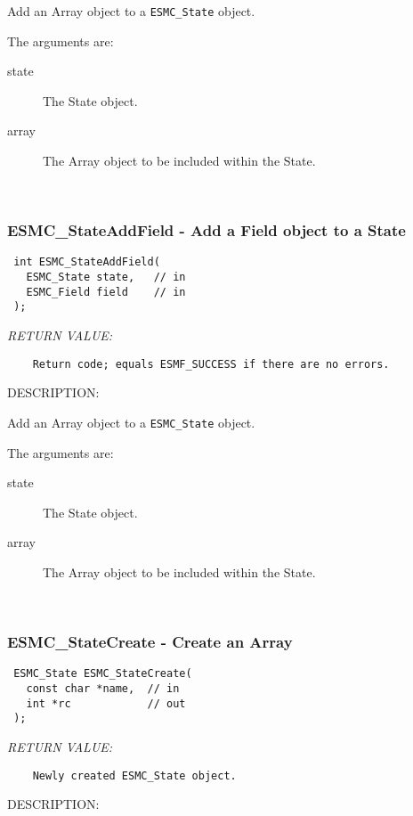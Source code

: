   
    Add an Array object to a {\tt ESMC\_State} object.
  
    The arguments are:
    \begin{description}
    \item[state]
      The State object.
    \item[array]
      The Array object to be included within the State.
    \end{description}
   
 
\mbox{}\hrulefill\ 
 
\subsubsection [ESMC\_StateAddField] {ESMC\_StateAddField - Add a Field object to a State}


  
\begin{verbatim} int ESMC_StateAddField(
   ESMC_State state,   // in
   ESMC_Field field    // in
 );\end{verbatim}{\em RETURN VALUE:}
\begin{verbatim}    Return code; equals ESMF_SUCCESS if there are no errors.\end{verbatim}
{\sf DESCRIPTION:\\ }


  
    Add an Array object to a {\tt ESMC\_State} object.
  
    The arguments are:
    \begin{description}
    \item[state]
      The State object.
    \item[array]
      The Array object to be included within the State.
    \end{description}
   
 
\mbox{}\hrulefill\ 
 
\subsubsection [ESMC\_StateCreate] {ESMC\_StateCreate - Create an Array}


  
\begin{verbatim} ESMC_State ESMC_StateCreate(
   const char *name,  // in
   int *rc            // out
 );\end{verbatim}{\em RETURN VALUE:}
\begin{verbatim}    Newly created ESMC_State object.\end{verbatim}
{\sf DESCRIPTION:\\ }


